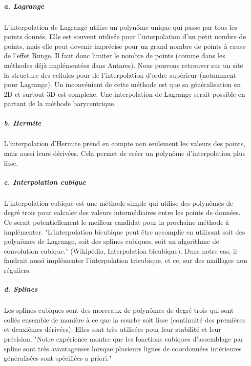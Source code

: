 \subparagraph{a. Lagrange}

L'interpolation de Lagrange utilise un polynôme unique qui passe par tous les points donnés. Elle est souvent utilisée pour l'interpolation d'un petit nombre de points, mais elle peut devenir imprécise pour un grand nombre de points à cause de l'effet Runge. Il faut donc limiter le nombre de points (comme dans les méthodes déjà implémentées dans Antares).
Nous pouvons retrouver sur un site\cite{structure} la structure des cellules pour de l'interpolation d'ordre supérieur (notamment pour Lagrange). Un inconvénient de cette méthode est que sa généralisation en 2D et surtout 3D est complexe.
Une interpolation de Lagrange serait possible en partant de la méthode barycentrique.\cite{Barycentric_Lagrange1}\cite{Barycentric_Lagrange2}


\subparagraph{b. Hermite\cite{bajaj}}

L'interpolation d'Hermite prend en compte non seulement les valeurs des points, mais aussi leurs dérivées. Cela permet de créer un polynôme d'interpolation plus lisse.

\subparagraph{c. Interpolation cubique}
L'interpolation cubique est une méthode simple qui utilise des polynômes de degré trois pour calculer des valeurs intermédiaires entre les points de données.\cite{tanaka} Ce serait potentiellement le meilleur candidat pour la prochaine méthode à implémenter. %
"L'interpolation bicubique peut être accomplie en utilisant soit des polynômes de Lagrange, soit des splines cubiques, soit un algorithme de convolution cubique." (Wikipédia, Interpolation bicubique). Dans notre cas, il faudrait aussi implémenter l'interpolation tricubique, et ce, sur des maillages non réguliers.

\subparagraph{d. Splines}

Les splines cubiques sont des morceaux de polynômes de degré trois qui sont collés ensemble de manière à ce que la courbe soit lisse (continuité des premières et deuxièmes dérivées). Elles sont très utilisées pour leur stabilité et leur précision.
"Notre expérience montre que les fonctions cubiques d'assemblage par spline sont très avantageuses lorsque plusieurs lignes de coordonnées intérieures généralisées sont spécifiées a priori."\cite{gordont1971}

